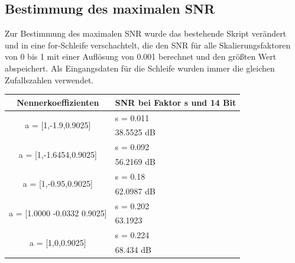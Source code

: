 \subsection{Bestimmung des maximalen SNR}

Zur Bestimmung des maximalen SNR wurde das bestehende Skript verändert und in eine for-Schleife verschachtelt, die den SNR für alle Skalierungsfaktoren von 0 bis 1 mit einer Auflösung von 0.001 berechnet und den größten Wert abspeichert. Als Eingangsdaten für die Schleife wurden immer die gleichen Zufallszahlen verwendet.

\begin{table}[H]
\centering
\begin{tabular}{|c|l|}
\hline
Nennerkoeffizienten                              & \multicolumn{1}{c|}{SNR bei Faktor s und 14 Bit} \\ \hline
\multirow{2}{*}{a = {[}1,-1.9,0.9025{]}}         & s = 0.011                                        \\
                                                 & 38.5525 dB                                       \\ \hline
\multirow{2}{*}{a = {[}1,-1.6454,0.9025{]}}      & s = 0.092                                        \\
                                                 & 56.2169 dB                                       \\ \hline
\multirow{2}{*}{a = {[}1,-0.95,0.9025{]}}        & s = 0.18                                         \\
                                                 & 62.0987 dB                                       \\ \hline
\multirow{2}{*}{a = {[}1.0000 -0.0332 0.9025{]}} & s = 0.202                                        \\
                                                 & 63.1923                                          \\ \hline
\multirow{2}{*}{a = {[}1,0,0.9025{]}}            & s = 0.224                                        \\
                                                 & 68.434 dB                                        \\ \hline
\end{tabular}
\end{table}

